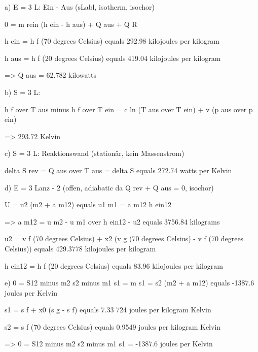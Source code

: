 a) E = 3 L: Ein - Aus (sLabl, isotherm, isochor)

0 = m rein (h ein - h aus) + Q aus + Q R

h ein = h f (70 degrees Celsius) equals 292.98 kilojoules per kilogram

h aus = h f (20 degrees Celsius) equals 419.04 kilojoules per kilogram

=> Q aus = 62.782 kilowatts

b) S = 3 L:

h f over T aus minus h f over T ein = c ln (T aus over T ein) + v (p aus over p ein)

=> 293.72 Kelvin

c) S = 3 L: Reaktionswand (stationär, kein Massenstrom)

delta S rev = Q aus over T aus = delta S equals 272.74 watts per Kelvin

d) E = 3 Lanz - 2 (offen, adiabatic da Q rev + Q aus = 0, isochor)

U = u2 (m2 + a m12) equals u1 m1 = a m12 h ein12

=> a m12 = u m2 - u m1 over h ein12 - u2 equals 3756.84 kilograms

u2 = v f (70 degrees Celsius) + x2 (v g (70 degrees Celsius) - v f (70 degrees Celsius)) equals 429.3778 kilojoules per kilogram

h ein12 = h f (20 degrees Celsius) equals 83.96 kilojoules per kilogram

e) 0 = S12 minus m2 s2 minus m1 s1 = m s1 = s2 (m2 + a m12) equals -1387.6 joules per Kelvin

s1 = s f + x0 (s g - s f) equals 7.33 724 joules per kilogram Kelvin

s2 = s f (70 degrees Celsius) equals 0.9549 joules per kilogram Kelvin

=> 0 = S12 minus m2 s2 minus m1 s1 = -1387.6 joules per Kelvin